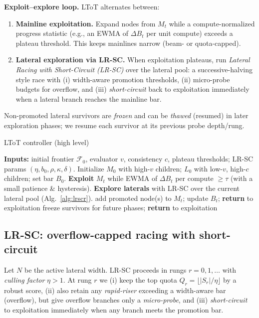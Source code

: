 \documentclass{article}
\begin{document}
\textbf{Exploit--explore loop.}
LToT alternates between:
\begin{enumerate}
    \item \textbf{Mainline exploitation.} Expand nodes from $M_t$ while a compute-normalized progress statistic (e.g., an EWMA of $\Delta B_t$ per unit compute) exceeds a plateau threshold. This keeps mainlines narrow (beam- or quota-capped).
    \item \textbf{Lateral exploration via LR-SC.} When exploitation plateaus, run \emph{Lateral Racing with Short-Circuit (LR-SC)} over the lateral pool: a successive-halving style race with (i) width-aware promotion thresholds, (ii) micro-probe budgets for overflow, and (iii) \emph{short-circuit} back to exploitation immediately when a lateral branch reaches the mainline bar.
\end{enumerate}
Non-promoted lateral survivors are \emph{frozen} and can be \emph{thawed} (resumed) in later exploration phases; we resume each survivor at its previous probe depth/rung.

\begin{algorithm}[t]
\caption{LToT controller (high level)}
\label{alg:ltot-controller}
\begin{algorithmic}[1]
\State \textbf{Inputs:} initial frontier $\mathcal{F}_0$, evaluator $v$, consistency $c$, plateau thresholds; LR-SC params $(\eta,b_0,\rho, \kappa,\delta)$.
\State Initialize $M_0$ with high-$v$ children; $L_0$ with low-$v$, high-$c$ children; set bar $B_0$.
  \State \textbf{Exploit} $M_t$ while EWMA of $\Delta B_t$ per compute $\ge \tau$ (with a small patience \& hysteresis).
  \State \textbf{Explore laterals} with LR-SC over the current lateral pool (Alg.~\ref{alg:lrscr}). \label{line:lrscr}
     \State add promoted node(s) to $M_t$; update $B_t$; \textbf{return} to exploitation
  \Else
     \State freeze survivors for future phases; \textbf{return} to exploitation
  \EndIf
\EndWhile
\end{algorithmic}
\end{algorithm}

\vspace{-0.5em}
\subsection{LR-SC: overflow-capped racing with short-circuit}
\label{sec:lrscr}

Let $N$ be the active lateral width.
LR-SC proceeds in rungs $r=0,1,\dots$ with \emph{culling factor} $\eta>1$.
At rung $r$ we (i) keep the top quota $Q_r=\lfloor |S_r|/\eta \rfloor$ by a robust score, (ii) also retain any \emph{rapid-riser} exceeding a width-aware bar (overflow), but give overflow branches only a \emph{micro-probe}, and (iii) \emph{short-circuit} to exploitation immediately when any branch meets the promotion bar.
\end{document}
